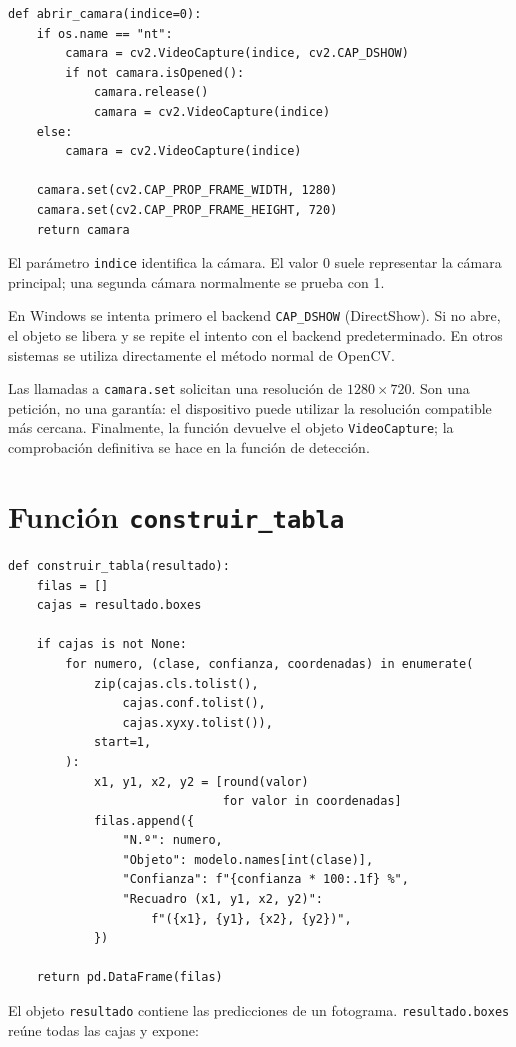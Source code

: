 \documentclass[11pt,a4paper]{article}
\begin{document}
\begin{lstlisting}
def abrir_camara(indice=0):
    if os.name == "nt":
        camara = cv2.VideoCapture(indice, cv2.CAP_DSHOW)
        if not camara.isOpened():
            camara.release()
            camara = cv2.VideoCapture(indice)
    else:
        camara = cv2.VideoCapture(indice)

    camara.set(cv2.CAP_PROP_FRAME_WIDTH, 1280)
    camara.set(cv2.CAP_PROP_FRAME_HEIGHT, 720)
    return camara
\end{lstlisting}

El parámetro \texttt{indice} identifica la cámara. El valor 0 suele
representar la cámara principal; una segunda cámara normalmente se prueba con
1.

En Windows se intenta primero el backend \texttt{CAP\_DSHOW}
(DirectShow). Si no abre, el objeto se libera y se repite el intento con el
backend predeterminado. En otros sistemas se utiliza directamente el método
normal de OpenCV.

Las llamadas a \texttt{camara.set} solicitan una resolución de \(1280\times
720\). Son una petición, no una garantía: el dispositivo puede utilizar la
resolución compatible más cercana. Finalmente, la función devuelve el objeto
\texttt{VideoCapture}; la comprobación definitiva se hace en la función de
detección.

\section{Función \texttt{construir\_tabla}}

\begin{lstlisting}
def construir_tabla(resultado):
    filas = []
    cajas = resultado.boxes

    if cajas is not None:
        for numero, (clase, confianza, coordenadas) in enumerate(
            zip(cajas.cls.tolist(),
                cajas.conf.tolist(),
                cajas.xyxy.tolist()),
            start=1,
        ):
            x1, y1, x2, y2 = [round(valor)
                              for valor in coordenadas]
            filas.append({
                "N.º": numero,
                "Objeto": modelo.names[int(clase)],
                "Confianza": f"{confianza * 100:.1f} %",
                "Recuadro (x1, y1, x2, y2)":
                    f"({x1}, {y1}, {x2}, {y2})",
            })

    return pd.DataFrame(filas)
\end{lstlisting}

El objeto \texttt{resultado} contiene las predicciones de un fotograma.
\texttt{resultado.boxes} reúne todas las cajas y expone:
\end{document}
